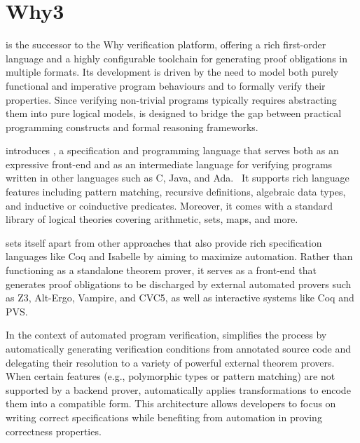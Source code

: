 
\section{Why3}
\label{sec:Why3}

\whythree is the successor to the Why verification platform, offering a rich first-order language and a highly configurable 
toolchain for generating proof obligations in multiple formats. Its development is driven by the need to model both purely 
functional and imperative program behaviours and to formally verify their properties. Since verifying non-trivial programs 
typically requires abstracting them into pure logical models, \whythree is designed to bridge the gap between practical programming 
constructs and formal reasoning frameworks.

\whythree introduces \whyml, a specification and programming language that serves both as an expressive front-end and as 
an intermediate language for verifying programs written in other languages such as C, Java, and Ada.~\cite{FilliatreP13} 
It supports rich language features including pattern matching, recursive definitions, algebraic data types, and inductive or 
coinductive predicates. Moreover, it comes with a standard library of logical theories covering arithmetic, sets, maps, 
and more.

\whythree sets itself apart from other approaches that also provide rich specification languages like \textsf{Coq} and 
\textsf{Isabelle} by aiming to maximize automation. Rather than functioning as a standalone theorem prover, it serves 
as a front-end that generates proof obligations to be discharged by external automated provers such as Z3, Alt-Ergo, 
Vampire, and CVC5, as well as interactive systems like Coq and PVS.

In the context of automated program verification, \whythree simplifies the process by automatically generating verification 
conditions from annotated source code and delegating their resolution to a variety of powerful external theorem provers. 
When certain features (e.g., polymorphic types or pattern matching) are not supported by a backend prover, \whythree automatically 
applies transformations to encode them into a compatible form. This architecture allows developers to focus on writing 
correct specifications while benefiting from automation in proving correctness properties.~\cite{boogie11why3}


